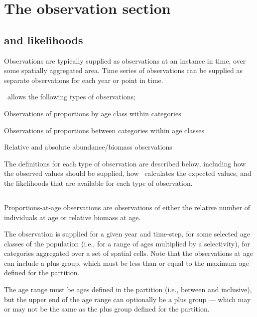 \section{The observation section\label{sec:observation-section}}

\subsection{ and likelihoods\label{sec:likelihoods}}

Observations are typically supplied as observations at an instance in time, over some spatially aggregated area. Time series of observations can be supplied as separate observations for each year or point in time. 

\SPM\ allows the following types of observations;

\begin{description}
  \item Observations of proportions by age class within categories
  \item Observations of proportions between categories within age classes
  \item Relative and absolute abundance/biomass observations
\end{description}

The definitions for each type of observation are described below, including how the observed values should be supplied, how \SPM\ calculates the expected values, and the likelihoods that are available for each type of observation.

\subsection{}

Proportions-at-age observations are observations of either the relative number of individuals at age or relative biomass at age. 

The observation is supplied for a given year and time-step, for some selected age classes of the population (i.e., for a range of ages multiplied by a selectivity), for categories aggregated over a set of spatial cells. Note that the observations at age can include a plus group, which must be less than or equal to the maximum age defined for the partition.

The age range must be ages defined in the partition (i.e., between  and  inclusive), but the upper end of the age range can optionally be a plus group --- which may or may not be the same as the plus group defined for the partition. 

